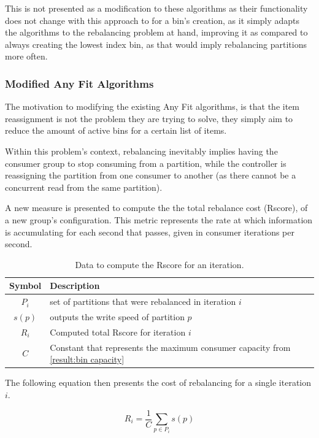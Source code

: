 This is not presented as a modification to these algorithms as their functionality does not change with this approach to for a bin's creation, as it simply adapts the algorithms to the rebalancing problem at hand, improving it as compared to always creating the lowest index bin, as that would imply rebalancing partitions more often.

\subsubsection{Modified Any Fit Algorithms}

The motivation to modifying the existing Any Fit algorithms, is that the item reassignment is not the problem they are trying to solve, they simply aim to reduce the amount of active bins for a certain list of items. 

Within this problem's context, rebalancing inevitably implies having the consumer group to stop consuming from a partition, while the controller is reassigning the partition from one consumer to another (as there cannot be a concurrent read from the same partition).

A new measure is presented to compute the the total rebalance cost (Rscore), of a new group's configuration. This metric represents the rate at which information is accumulating for each second that passes, given in consumer iterations per second.

\begin{table}[H]
\centering
\caption{Data to compute the Rscore for an iteration.}
\begin{tabular}{ |c|l| } 
    \hline
    \textbf{Symbol} & \textbf{Description} \\ 
    \hline
    $P_i$ & set of partitions that were rebalanced in iteration $i$ \\
    $s(p)$ & outputs the write speed of partition $p$ \\ 
    $R_i$  & Computed total Rscore for iteration $i$ \\ 
    $C$ &  Constant that represents the maximum consumer capacity from \ref{result:bin capacity}\\
    \hline
\end{tabular}
\end{table}

The following equation then presents the cost of rebalancing for a single iteration $i$.

\begin{equation}
    R_i = \frac{1}{C}\sum_{p \in P_i} s(p)
\end{equation}

